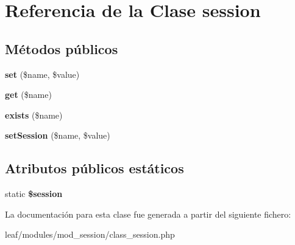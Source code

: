 \hypertarget{classsession}{\section{Referencia de la Clase session}
\label{classsession}
}
\subsection*{Métodos públicos}
\begin{DoxyCompactItemize}
\item 
\hypertarget{classsession_aa4c6a0b87c6e47fa6f863eedb300e707}{{\bfseries set} (\$name, \$value)}\label{classsession_aa4c6a0b87c6e47fa6f863eedb300e707}

\item 
\hypertarget{classsession_af5ea6a083ddb07beb8a30dd32e309ceb}{{\bfseries get} (\$name)}\label{classsession_af5ea6a083ddb07beb8a30dd32e309ceb}

\item 
\hypertarget{classsession_a0909de156d39accf2e3c52f4bce3765f}{{\bfseries exists} (\$name)}\label{classsession_a0909de156d39accf2e3c52f4bce3765f}

\item 
\hypertarget{classsession_ade4fdae3d26d103f29d7cdbd55f4129f}{{\bfseries set\-Session} (\$name, \$value)}\label{classsession_ade4fdae3d26d103f29d7cdbd55f4129f}

\end{DoxyCompactItemize}
\subsection*{Atributos públicos estáticos}
\begin{DoxyCompactItemize}
\item 
\hypertarget{classsession_abefb3c26429d514777313e9a63d7cbac}{static {\bfseries \$session}}\label{classsession_abefb3c26429d514777313e9a63d7cbac}

\end{DoxyCompactItemize}


La documentación para esta clase fue generada a partir del siguiente fichero\-:\begin{DoxyCompactItemize}
\item 
leaf/modules/mod\-\_\-session/class\-\_\-session.\-php\end{DoxyCompactItemize}
